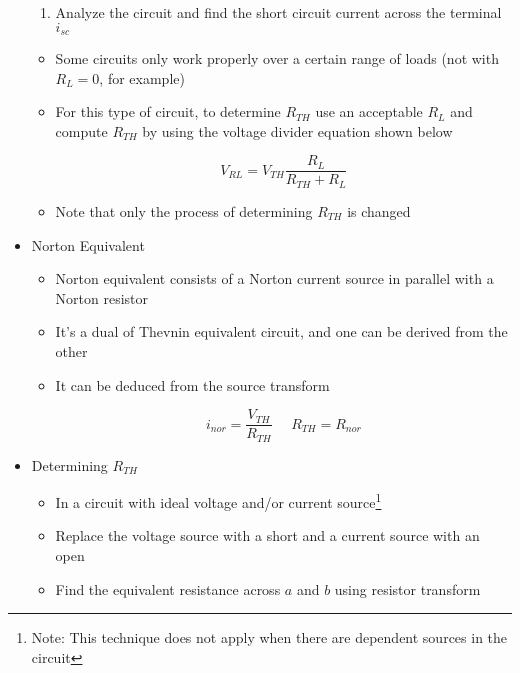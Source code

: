 \begin{itemize}
\begin{enumerate}
      \item Analyze the circuit and find the short circuit current across the terminal $i_{sc}$

    \end{enumerate}

    \begin{itemize}

      \item Some circuits only work properly over a certain range of loads (not with $R_L=0$, for example)

      \item For this type of circuit, to determine $R_{TH}$ use an acceptable $R_L$ and compute $R_{TH}$ by using the voltage divider equation shown below

        $$V_{RL}=V_{TH}\frac{R_L}{R_{TH}+R_L}$$

      \item Note that only the process of determining $R_{TH}$ is changed

    \end{itemize}
    
  \item Norton Equivalent

    \begin{itemize}

      \item Norton equivalent consists of a Norton current source in parallel with a Norton resistor

      \item It's a dual of Thevnin equivalent circuit, and one can be derived from the other

      \item It can be deduced from the source transform

        $$\boxed{i_{nor}=\frac{V_{TH}}{R_{TH}}\,\,\,\,\,\,\,\,R_{TH}=R_{nor}}$$

    \end{itemize}

  \item Determining $R_{TH}$

    \begin{itemize}

      \item In a circuit with ideal voltage and/or current source\footnote{Note: This technique does not apply when there are dependent sources in the circuit}

      \item Replace the voltage source with a short and a current source with an open

      \item Find the equivalent resistance across $a$ and $b$ using resistor transform

    \end{itemize}

\end{itemize}



